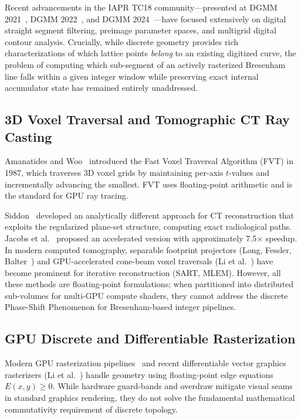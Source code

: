 \documentclass[12pt,a4paper]{article}
\theoremstyle{definition}
\begin{document}
Recent advancements in the IAPR TC18 community---presented at
DGMM 2021~\cite{dgmm2021,decelle2021digital},
DGMM 2022~\cite{dgmm2022proceedings}, and
DGMM 2024~\cite{dgmm2024proceedings}---have focused extensively on
digital straight segment filtering, preimage parameter spaces, and
multigrid digital contour analysis. Crucially, while discrete
geometry provides rich characterizations of which lattice points
\emph{belong} to an existing digitized curve, the problem of
computing which sub-segment of an actively rasterized Bresenham
line falls within a given integer window while preserving exact
internal accumulator state has remained entirely unaddressed.

\subsection{3D Voxel Traversal and Tomographic CT Ray Casting}

Amanatides and Woo~\cite{amanatides1987fast} introduced
the Fast Voxel Traversal Algorithm (FVT) in 1987, which
traverses 3D voxel grids by maintaining per-axis $t$-values
and incrementally advancing the smallest. FVT uses
floating-point arithmetic and is the standard for GPU ray
tracing.

Siddon~\cite{siddon1985fast} developed an analytically
different approach for CT reconstruction that exploits the
regularized plane-set structure, computing exact radiological
paths. Jacobs et al.~\cite{jacobs1998fast} proposed an
accelerated version with approximately 7.5$\times$ speedup.
In modern computed tomography, separable footprint projectors
(Long, Fessler, Balter~\cite{long2010separable}) and GPU-accelerated
cone-beam voxel traversals (Li et al.~\cite{li2020gpu}) have become
prominent for iterative reconstruction (SART, MLEM). However, all
these methods are floating-point formulations; when partitioned
into distributed sub-volumes for multi-GPU compute shaders, they
cannot address the discrete Phase-Shift Phenomenon for
Bresenham-based integer pipelines.

\subsection{GPU Discrete and Differentiable Rasterization}

Modern GPU rasterization pipelines~\cite{laine2011high} and recent
differentiable vector graphics rasterizers (Li et
al.~\cite{li2020diffvg}) handle geometry using floating-point edge
equations $E(x,y) \ge 0$. While hardware guard-bands and overdraw
mitigate visual seams in standard graphics rendering, they do not
solve the fundamental mathematical commutativity requirement of
discrete topology.
\end{document}
